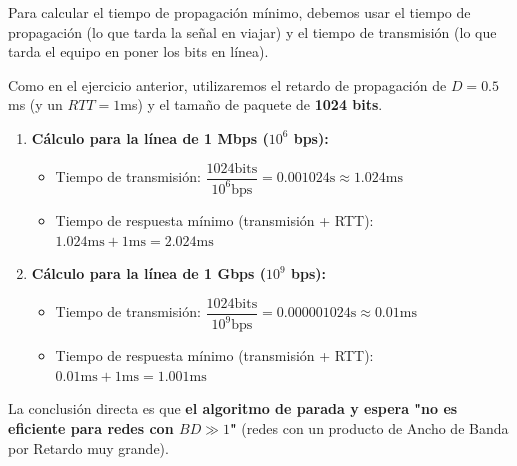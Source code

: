 \begin{enumerate}[label=\color{red}\textbf{\arabic*)}]
	      Para calcular el tiempo de propagación mínimo, debemos usar el tiempo de propagación (lo que tarda la señal en viajar) y el tiempo de transmisión (lo que tarda el equipo en poner los bits en línea).

	      Como en el ejercicio anterior, utilizaremos el retardo de propagación de $D=0.5$ms (y un $RTT=1$ms) y el tamaño de paquete de \textbf{1024 bits}.
	      \begin{enumerate}[label=\arabic*)]
		      \item \textbf{Cálculo para la línea de 1 Mbps ($10^6$ bps):}
		            \begin{itemize}[label=\textbullet]
			            \item Tiempo de transmisión: $\dfrac{1024\mathrm{bits}}{10^6\mathrm{bps}}=0.001024\mathrm{s}\approx 1.024\mathrm{ms}$
			            \item Tiempo de respuesta mínimo (transmisión + RTT): $1.024 \mathrm{ms}+1\mathrm{ms}=2.024\mathrm{ms}$
		            \end{itemize}
		      \item \textbf{Cálculo para la línea de 1 Gbps ($10^9$ bps):}
		            \begin{itemize}[label=\textbullet]
			            \item Tiempo de transmisión: $\dfrac{1024\mathrm{bits}}{10^9\mathrm{bps}}=0.000001024\mathrm{s}\approx 0.01\mathrm{ms}$
			            \item Tiempo de respuesta mínimo (transmisión + RTT): $0.01 \mathrm{ms}+1\mathrm{ms}=1.001\mathrm{ms}$
		            \end{itemize}
	      \end{enumerate}
	      La conclusión directa es que \textbf{el algoritmo de parada y espera "no es eficiente para redes con $BD\gg 1$"} (redes con un producto de Ancho de Banda por Retardo muy grande).


\end{enumerate}
